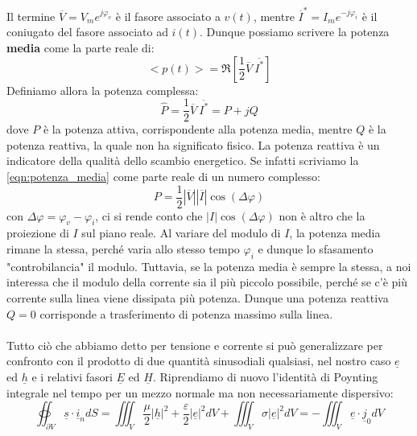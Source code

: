 \documentclass{book}
\begin{document}
        Il termine $\overline{V}=V_{m}e^{j \varphi_{v}}$ è il fasore associato a $v(t)$, mentre $\overline{I}^{*}=I_{m}e^{-j\varphi_{i}}$ è il
        coniugato del fasore associato ad $i(t)$. Dunque possiamo scrivere la potenza \textbf{media} come la parte reale di:
        \begin{equation}
                <p(t)>=\Re[\frac{1}{2}\overline{V} \ \overline{I^{*}}]
        \end{equation}
        Definiamo allora la potenza complessa:
        \begin{equation}
            \label{eqn:potenza_media}
            \hat{P} = \frac{1}{2}\overline{V} \ \overline{I^{*}} = P+jQ
        \end{equation}
        dove $P$ è la potenza attiva, corrispondente alla potenza media, mentre $Q$ è la potenza reattiva,
        la quale non ha significato fisico. La potenza reattiva è un indicatore della qualità dello scambio energetico.
        Se infatti scriviamo la \ref{eqn:potenza_media} come parte reale di un numero complesso:
        \begin{equation}
            P=\frac{1}{2}|\overline{V}||\overline{I}|\cos{(\Delta \varphi)}
        \end{equation}
        con $\Delta \varphi = \varphi_{v}-\varphi_{i}$, ci si rende conto che $|I|\cos{(\Delta \varphi)}$ non è altro
        che la proiezione di $I$ sul piano reale. Al variare del modulo di $I$, la potenza media rimane la stessa, perché varia
        allo stesso tempo $\varphi_{i}$ e dunque lo sfasamento "controbilancia" il modulo. Tuttavia, se la potenza media è sempre la stessa,
        a noi interessa che il modulo della corrente sia il più piccolo possibile, perché se c'è più corrente sulla
        linea viene dissipata più potenza. Dunque una potenza reattiva $Q=0$ corrisponde a trasferimento di potenza massimo sulla linea. \\ \\
        Tutto ciò che abbiamo detto per tensione e corrente si può generalizzare per confronto con il prodotto di due quantità sinusodiali
        qualsiasi, nel nostro caso $\underline{e}$ ed $\underline{h}$ e i relativi fasori $\underline{E}$ ed $\underline{H}$.
        Riprendiamo di nuovo l'identità di Poynting  integrale nel tempo per un mezzo normale ma non necessariamente dispersivo:
        \begin{equation}
            \oiint_{\partial V} \underline{s} \cdot \underline{i}_{n}dS = \iiint_{V}  \frac{\mu}{2} |\underline{h}|^{2}+\frac{\varepsilon}{2}|\underline{e}|^{2} dV+
            \iiint_{V} \sigma |\underline{e}|^{2}dV = - \iiint_{V} \underline{e} \cdot \underline{j}_{0}dV
        \end{equation}
\end{document}
